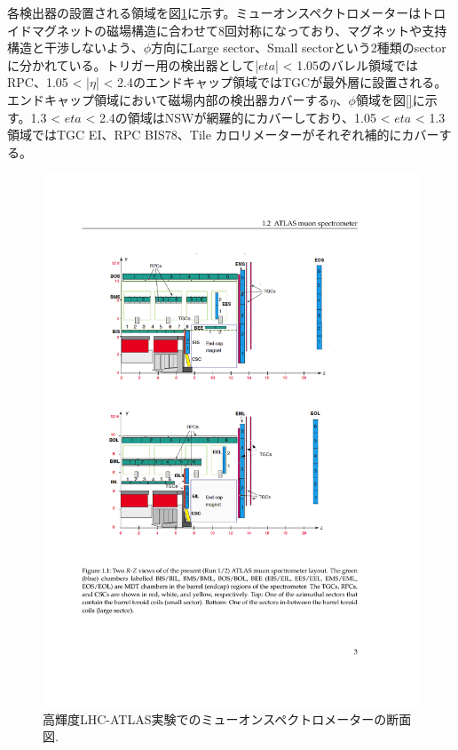各検出器の設置される領域を図\ref{Muonspectrometer2}に示す。ミューオンスペクトロメーターはトロイドマグネットの磁場構造に合わせて8回対称になっており、マグネットや支持構造と干渉しないよう、$\phi$方向にLarge sector、Small sectorという2種類のsectorに分かれている。トリガー用の検出器として|$eta$| < 1.05のバレル領域ではRPC、1.05 < |$\eta$| < 2.4のエンドキャップ領域ではTGCが最外層に設置される。エンドキャップ領域において磁場内部の検出器カバーする$\eta$、$\phi$領域を図\ref{}に示す。1.3 < $eta$ < 2.4の領域はNSWが網羅的にカバーしており、1.05 < $eta$ < 1.3領域ではTGC EI、RPC BIS78、Tile カロリメーターがそれぞれ補的にカバーする。

\begin{figure} 
\centering
\includegraphics[width=16cm]{fig/Intro/Muonspectrometer.pdf}
\caption[高輝度LHC-ATLAS実験でのミューオンスペクトロメーターの断面図]{高輝度LHC-ATLAS実験でのミューオンスペクトロメーターの断面図.\cite{tdr_phase2muon_2017017}
}
\label{Muonspectrometer2}
\end{figure}


